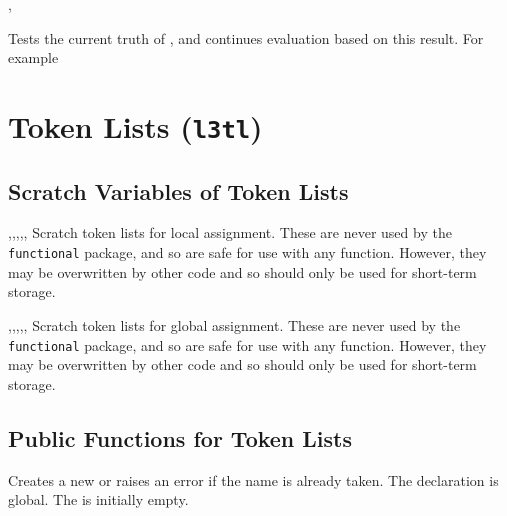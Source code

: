\documentclass[oneside]{book}
\begin{document}
\begin{function}{\BoolIf,\BoolIfTF}
\begin{syntax}
 
   
\end{syntax}
Tests the current truth of , and continues evaluation
based on this result. For example
\begin{demohigh}
\BoolSetTrue\lTmpaBool
\BoolIfTF{}
\BoolSetFalse\lTmpaBool
\BoolIfTF{}
\end{demohigh}
\end{function}

\chapter{Token Lists (\texttt{l3tl})}

\section{Scratch Variables of Token Lists}

\begin{variable}{\lTmpaTl,\lTmpbTl,\lTmpcTl,\lTmpiTl,\lTmpjTl,\lTmpkTl}
Scratch token lists for local assignment. These are never used by
the \verb!functional! package, and so are safe for use with any
function. However, they may be overwritten by other
code and so should only be used for short-term storage.
\end{variable}

\begin{variable}{\gTmpaTl,\gTmpbTl,\gTmpcTl,\gTmpiTl,\gTmpjTl,\gTmpkTl}
Scratch token lists for global assignment. These are never used by
the \verb!functional! package, and so are safe for use with any
function. However, they may be overwritten by other
code and so should only be used for short-term storage.
\end{variable}

\section{Public Functions for Token Lists}

\begin{function}{\TlNew}
\begin{syntax}
 
\end{syntax}
Creates a new  or raises an error if the
name is already taken. The declaration is global. The
 is initially empty.
\end{function}
\end{document}
